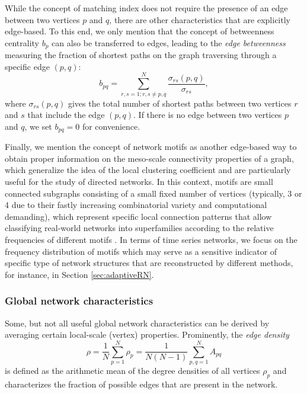 		While the concept of matching index does not require the presence of an edge between two vertices $p$ and $q$, there are other characteristics that are explicitly edge-based. To this end, we only mention that the concept of betweenness centrality $b_p$ can also be transferred to edges, leading to the \textit{edge betweenness} measuring the fraction of shortest paths on the graph traversing through a specific edge $(p,q)$:
\begin{equation}
  {b}_{pq} =\sum_{r,s=1; r,s\neq p,q}^N \frac{  {\sigma}_{rs}(p,q)}{  {\sigma}_{rs}},
\label{eq:edgebetweenness}
\end{equation}
\noindent
where $  {\sigma}_{rs}(p,q)$ gives the total number of shortest paths between two vertices $r$ and $s$ that include the edge $(p,q)$. If there is no edge between two vertices $p$ and $q$, we set $  {b}_{pq}=0$ for convenience. 
        
        		Finally, we mention the concept of network motifs \cite{Milo2002} as another edge-based way to obtain proper information on the meso-scale connectivity properties of a graph, which generalize the idea of the local clustering coefficient and are particularly useful for the study of directed networks. In this context, motifs are small connected subgraphs consisting of a small fixed number of vertices (typically, 3 or 4 due to their fastly increasing combinatorial variety and computational demanding), which represent specific local connection patterns that allow classifying real-world networks into superfamilies according to the relative frequencies of different motifs \cite{Milo2002}. In terms of time series networks, we focus on the frequency distribution of motifs which may serve as a sensitive indicator of specific type of network structures that are reconstructed by different methods, for instance, in Section \ref{sec:adaptiveRN}. 
		        
        		\subsubsection{Global network characteristics}
		Some, but not all useful global network characteristics can be derived by averaging certain local-scale (vertex) properties. Prominently, the \textit{edge density}
\begin{equation}
  {\rho} =\frac{1}{N}\sum_{p=1}^N   {\rho}_p =\frac{1}{N(N-1)} \sum_{p,q=1}^N A_{pq} 
\label{eq:edgedensity}
\end{equation}
is defined as the arithmetic mean of the degree densities of all vertices $\rho_p$ and characterizes the fraction of possible edges that are present in the network. 

